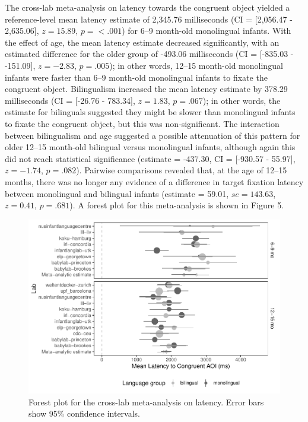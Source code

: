 \documentclass[
  english,
  ,man,floatsintext]{apa6}
\begin{document}
The cross-lab meta-analysis on latency towards the congruent object yielded a reference-level mean latency estimate of 2,345.76 milliseconds (CI = {[}2,056.47 - 2,635.06{]}, \(z = 15.89\), \(p = < .001\)) for 6--9 month-old monolingual infants. With the effect of age, the mean latency estimate decreased significantly, with an estimated difference for the older group of -493.06 milliseconds (CI = {[}-835.03 - -151.09{]}, \(z = -2.83\), \(p = .005\)); in other words, 12--15 month-old monolingual infants were faster than 6--9 month-old monolingual infants to fixate the congruent object. Bilingualism increased the mean latency estimate by 378.29 milliseconds (CI = {[}-26.76 - 783.34{]}, \(z = 1.83\), \(p = .067\)); in other words, the estimate for bilinguals suggested they might be slower than monolingual infants to fixate the congruent object, but this was non-significant. The interaction between bilingualism and age suggested a possible attenuation of this pattern for older 12--15 month-old bilingual versus monolingual infants, although again this did not reach statistical significance (estimate = -437.30, CI = {[}-930.57 - 55.97{]}, \(z = -1.74\), \(p = .082\)). Pairwise comparisons revealed that, at the age of 12--15 months, there was no longer any evidence of a difference in target fixation latency between monolingual and bilingual infants (estimate = 59.01, \(se = 143.63\), \(z = 0.41\), \(p = .681\)). A forest plot for this meta-analysis is shown in Figure 5.

\begin{figure}
\centering
\includegraphics{gaze-following-paper_files/figure-latex/fig5-1.pdf}
\caption{\label{fig:fig5}Forest plot for the cross-lab meta-analysis on latency. Error bars show 95\% confidence intervals.}
\end{figure}
\end{document}

